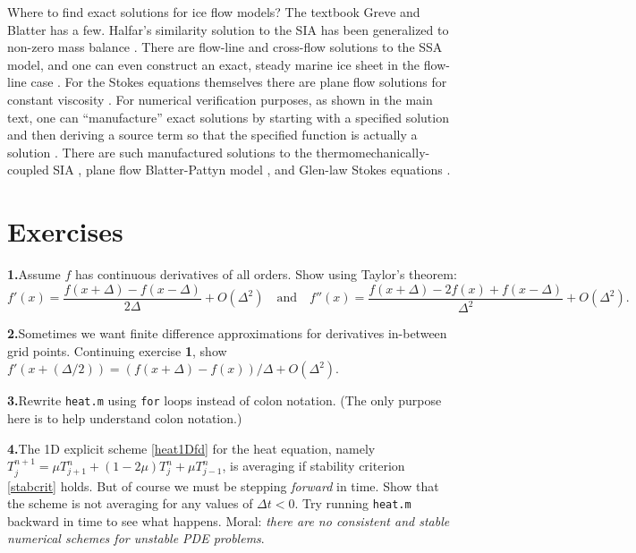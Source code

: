 \documentclass[letterpaper,final,12pt,reqno]{amsart}
\begin{document}
Where to find exact solutions for ice flow models?  The textbook Greve and Blatter \cite{GreveBlatter2009} has a few.  Halfar's similarity solution to the SIA \cite{Halfar81,Halfar83} has been generalized to non-zero mass balance \cite{BLKCB}.  There are flow-line \cite{Bodvardsson,vanderVeen83} and cross-flow \cite{SchoofStream} solutions to the SSA model, and one can even construct an exact, steady marine ice sheet in the flow-line case \cite{Bueler2014exactmarine}.  For the Stokes equations themselves there are plane flow solutions for constant viscosity \cite{BaliseRaymond1985}.  For numerical verification purposes, as shown in the main text, one can ``manufacture'' exact solutions by starting with a specified solution and then deriving a source term so that the specified function is actually a solution \cite{Roache}.  There are such manufactured solutions to the thermomechanically-coupled SIA \cite{BBL}, plane flow Blatter-Pattyn model \cite{GlowinskiRappaz}, and Glen-law Stokes equations \cite{JouvetRappaz2011,Lengetal2012,SargentFastook2010}.

\footnotesize

\bigskip
\bigskip
%
%


\bigskip
\bigskip
\small
\section*{Exercises}

\newcommand{\exer}[2]{\medskip\noindent \textbf{#1.}\quad #2}

\exer{1}{Assume $f$ has continuous derivatives of all orders.  Show using Taylor's theorem:
  $$f'(x) = \frac{f(x+\Delta) - f(x-\Delta)}{2\Delta} + O(\Delta^2) \quad \text{and} \quad f''(x) = \frac{f(x+\Delta) - 2 f(x) + f(x-\Delta)}{\Delta^2} + O(\Delta^2).$$}

\exer{2}{Sometimes we want finite difference approximations for derivatives in-between grid points.  Continuing exercise \textbf{1}, show $f'(x+(\Delta/2)) = (f(x+\Delta) - f(x))/\Delta + O(\Delta^2)$.}

\exer{3}{Rewrite \texttt{heat.m} using \texttt{for} loops instead of colon notation.  (The only purpose here is to help understand colon notation.)}

\exer{4}{The 1D explicit scheme \eqref{heat1Dfd} for the heat equation, namely $T_j^{n+1} = \mu T_{j+1}^n + (1 - 2 \mu) T_j^n + \mu T_{j-1}^n$, is averaging if stability criterion \eqref{stabcrit} holds.  But of course we must be stepping \emph{forward} in time.  Show that the scheme is not averaging for any values of $\Delta t < 0$.  Try running \texttt{heat.m} backward in time to see what happens.  Moral: \emph{there are no consistent and stable numerical schemes for unstable PDE problems}.}
\end{document}
